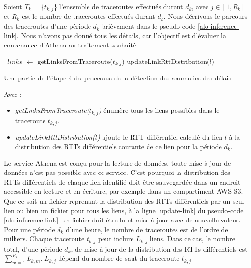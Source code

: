 Soient  $T_k$ = \{$t_{k, j}$\}  l'ensemble de traceroutes effectués durant $d_k$, avec $j \in [1, R_k]$ et $R_k$ est le nombre de traceroutes effectués durant $d_k$. Nous décrivons le parcours des traceroutes d'une période $d_k$ brièvement dans le pseudo-code \ref{alo-inference-link}. Nous n'avons pas donné  tous les détails, car l'objectif est d'évaluer la convenance d'Athena au traitement souhaité.
\begin{algorithm}[H]
\begin{algorithmic}[1]
	  \
	  \State $links$ $\leftarrow$ getLinksFromTraceroute($t_{k, j}$)
	  	 		\State updateLinkRttDistribution($l$) \label{update-link}
	  	 \EndFor
	 \EndFor
\end{algorithmic}
\caption{Une partie de l'étape $4$ du processus de la détection des anomalies des délais }
\label{alo-inference-link}
\end{algorithm}

Avec : 
\begin{itemize}
	\item \textit{getLinksFromTraceroute($t_{k, j}$)} énumère tous les liens possibles dans le traceroute $t_{k, j}$.

    \item \textit{updateLinkRttDistribution($l$)} ajoute le RTT différentiel calculé du lien $l$ à la distribution des RTTs différentiels courante de ce lien pour la période $d_k$.
\end{itemize}


Le service Athena est conçu pour la lecture de données, toute mise à jour de données n'est pas possible avec ce service. C'est pourquoi la distribution des RTTs différentiels de chaque  lien identifié doit être sauvegardée dans un endroit accessible en lecture et en écriture, par exemple dans un compartiment AWS S3. Que ce soit un fichier reprenant la distribution des RTTs différentiels  par un seul lien ou bien un fichier pour tous les liens,   à la ligne  \ref{update-link} du pseudo-code \ref{alo-inference-link}, un fichier doit être lu et mise à jour avec de nouvelle valeur. Pour une période $d_k$ d'une heure, le nombre de traceroutes est de l'ordre de milliers. Chaque traceroute $t_{k,j}$ peut inclure $L_{k,j}$ liens. Dans ce cas, le nombre total, d'une période $d_k$, de mise à jour de la distribution des RTTs différentiels est    $ \sum_{m=1}^{R_k}  L_{k,m}$. $ L_{k,j} $ dépend du nombre de saut du  traceroute $t_{k,j}$.


